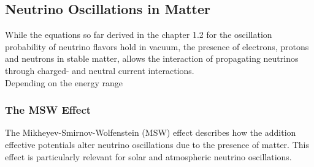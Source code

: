 \documentclass[a4paper,12pt,numbered]{article}
\begin{document}
\begin{table}[h!]
\centering
{}
\caption{Types of Neutrinos and Their Oscillation Sensitivities}

\end{table}

\subsection{Neutrino Oscillations in Matter}

While the equations so far derived in the chapter 1.2 for the oscillation probability of neutrino flavors hold in vacuum, the presence of electrons, protons and neutrons in stable matter, allows the interaction of propagating neutrinos through charged- and neutral current interactions.
\\
Depending on the energy range

\subsubsection{The MSW Effect}

The Mikheyev-Smirnov-Wolfenstein (MSW) effect describes how the addition effective potentials alter neutrino oscillations due to the presence of matter. This effect is particularly relevant for solar and atmospheric neutrino oscillations.
\end{document}
